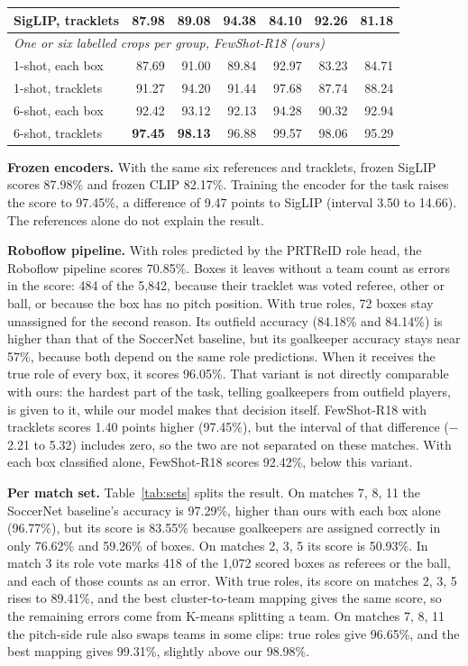 \documentclass[10pt]{article}
\begin{document}
\begin{table}[tbp]
\begin{tabular}{lrrrrrr}
SigLIP, tracklets & 87.98 & 89.08 & 94.38 & 84.10 & 92.26 & 81.18 \\
\midrule
\multicolumn{7}{l}{\emph{One or six labelled crops per group, FewShot-R18 (ours)}} \\
1-shot, each box & 87.69 & 91.00 & 89.84 & 92.97 & 83.23 & 84.71 \\
1-shot, tracklets & 91.27 & 94.20 & 91.44 & 97.68 & 87.74 & 88.24 \\
6-shot, each box & 92.42 & 93.12 & 92.13 & 94.28 & 90.32 & 92.94 \\
6-shot, tracklets & \textbf{97.45} & \textbf{98.13} & 96.88 & 99.57 & 98.06 & 95.29 \\
\bottomrule
\end{tabular}
\end{table}

\textbf{Frozen encoders.} With the same six references and tracklets, frozen SigLIP scores 87.98\% and frozen CLIP 82.17\%. Training the encoder for the task raises the score to 97.45\%, a difference of 9.47 points to SigLIP (interval 3.50 to 14.66). The references alone do not explain the result.

\textbf{Roboflow pipeline.} With roles predicted by the PRTReID role head, the Roboflow pipeline scores 70.85\%. Boxes it leaves without a team count as errors in the score: 484 of the 5,842, because their tracklet was voted referee, other or ball, or because the box has no pitch position. With true roles, 72 boxes stay unassigned for the second reason. Its outfield accuracy (84.18\% and 84.14\%) is higher than that of the SoccerNet baseline, but its goalkeeper accuracy stays near 57\%, because both depend on the same role predictions. When it receives the true role of every box, it scores 96.05\%. That variant is not directly comparable with ours: the hardest part of the task, telling goalkeepers from outfield players, is given to it, while our model makes that decision itself. FewShot-R18 with tracklets scores 1.40 points higher (97.45\%), but the interval of that difference ($-$2.21 to 5.32) includes zero, so the two are not separated on these matches. With each box classified alone, FewShot-R18 scores 92.42\%, below this variant.

\textbf{Per match set.} Table~\ref{tab:sets} splits the result. On matches 7, 8, 11 the SoccerNet baseline's accuracy is 97.29\%, higher than ours with each box alone (96.77\%), but its score is 83.55\% because goalkeepers are assigned correctly in only 76.62\% and 59.26\% of boxes. On matches 2, 3, 5 its score is 50.93\%. In match 3 its role vote marks 418 of the 1,072 scored boxes as referees or the ball, and each of those counts as an error. With true roles, its score on matches 2, 3, 5 rises to 89.41\%, and the best cluster-to-team mapping gives the same score, so the remaining errors come from K-means splitting a team. On matches 7, 8, 11 the pitch-side rule also swaps teams in some clips: true roles give 96.65\%, and the best mapping gives 99.31\%, slightly above our 98.98\%.
\end{document}
